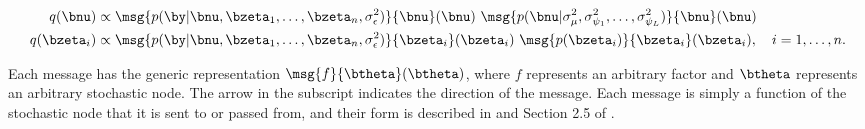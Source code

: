 \documentclass[ba]{imsart}
\numberwithin{equation}{section}
\theoremstyle{plain}
\def\sigsqeps{\sigma^2_{\epsilon}}
\def\sigsqmu{\sigma^2_{\mu}}
\newcommand\sigsqpsi[1]{\sigma^2_{\psi_{#1}}}
\begin{document}
\begin{align}
\begin{split}
	q (\bnu)
		&\propto
			\msg{p (\by | \bnu, \bzeta_1, \dots, \bzeta_n, \sigsqeps)}{\bnu} (\bnu) \
			\msg{p (\bnu | \sigsqmu, \sigsqpsi{1}, \dots, \sigsqpsi{L})}{\bnu} (\bnu) \\
	q (\bzeta_i)
		&\propto
			\msg{p (\by | \bnu, \bzeta_1, \dots, \bzeta_n, \sigsqeps)}{\bzeta_i} (\bzeta_i) \
			\msg{p (\bzeta_i)}{\bzeta_i} (\bzeta_i), \quad
		i = 1, \dots, n.
\end{split}
\label{nu_zeta_q_dens_funcs}
\end{align}

\noindent Each message has the generic representation $\msg{f}{\btheta} (\btheta)$,
where $f$ represents an arbitrary factor and $\btheta$
represents an arbitrary stochastic node. The arrow in the subscript indicates the direction of the message. Each
message is simply a function of the stochastic node that it is sent to or passed from, and their form
is described in \citet{minka05} and Section 2.5 of \citet{wand17}.
\end{document}
